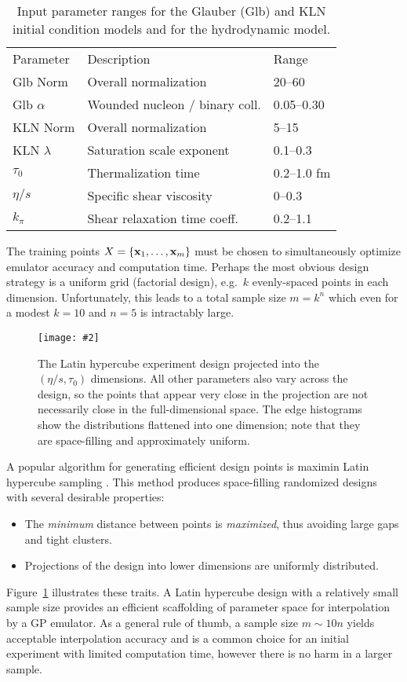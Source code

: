 \documentclass[aps,prc,reprint,superscriptaddress,amsmath]{revtex4-1}
\newcommand{\colfig}[3][t]{
  \begin{figure}[#1]
    \texttt{[image: \#2]}
    \caption{\label{fig:#2}#3}
  \end{figure}
}
\newcommand{\paddedhline}{\noalign{\smallskip}\hline\noalign{\smallskip}}
\begin{document}
\begin{table}[b]
  \caption{
    \label{tab:design}
    Input parameter ranges for the Glauber (Glb) and KLN initial condition models and for the hydrodynamic model.
  }
  \begin{ruledtabular}
  \begin{tabular}{lll}
    Parameter & Description & Range \\
    \paddedhline
    Glb Norm & Overall normalization & 20--60 \\
    Glb $\alpha$ & Wounded nucleon / binary coll. & 0.05--0.30 \\
    KLN Norm & Overall normalization & 5--15 \\
    KLN $\lambda$ & Saturation scale exponent & 0.1--0.3 \\
    $\tau_0$ & Thermalization time & 0.2--1.0 fm \\
    $\eta/s$ & Specific shear viscosity & 0--0.3 \\
    $k_\pi$ & Shear relaxation time coeff. & 0.2--1.1 \\
  \end{tabular}
  \end{ruledtabular}
\end{table}

The training points $X = \{\mathbf x_1, \ldots, \mathbf x_m\}$ must be chosen to simultaneously optimize emulator accuracy and computation time.
Perhaps the most obvious design strategy is a uniform grid (factorial design), e.g.\ $k$ evenly-spaced points in each dimension.
Unfortunately, this leads to a total sample size $m = k^n$ which even for a modest $k = 10$ and $n = 5$ is intractably large.

\colfig[t]{design}{
  The Latin hypercube experiment design projected into the $(\eta/s, \tau_0)$ dimensions.
  All other parameters also vary across the design, so the points that appear very close in the projection are not necessarily close in the full-dimensional space.
  The edge histograms show the distributions flattened into one dimension; note that they are space-filling and approximately uniform.
}

A popular algorithm for generating efficient design points is maximin Latin hypercube sampling \cite{Morris:1995lh}.
This method produces space-filling randomized designs with several desirable properties:
\begin{itemize}
  \item The \emph{minimum} distance between points is \emph{maximized}, thus avoiding large gaps and tight clusters.
  \item Projections of the design into lower dimensions are uniformly distributed.
\end{itemize}
Figure~\ref{fig:design} illustrates these traits.
A Latin hypercube design with a relatively small sample size provides an efficient scaffolding of parameter space for interpolation by a GP emulator.
As a general rule of thumb, a sample size $m \sim 10n$ yields acceptable interpolation accuracy \cite{Loeppky:2009ss} and is a common choice for an initial experiment with limited computation time, however there is no harm in a larger sample.
\end{document}
